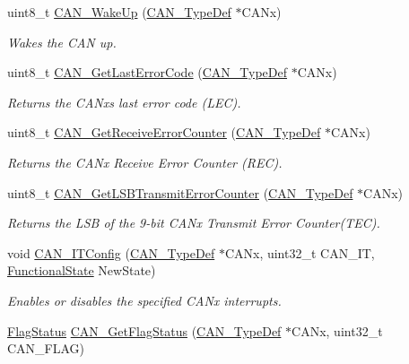 \begin{DoxyCompactItemize}
uint8\+\_\+t \hyperlink{group___c_a_n___exported___functions_ga78cdfbf1884b9e33c552bcbca15bed10}{C\+A\+N\+\_\+\+Wake\+Up} (\hyperlink{struct_c_a_n___type_def}{C\+A\+N\+\_\+\+Type\+Def} $\ast$C\+A\+Nx)
\begin{DoxyCompactList}\small\item\em Wakes the C\+AN up. \end{DoxyCompactList}\item 
uint8\+\_\+t \hyperlink{group___c_a_n___exported___functions_gaaee721a392b6b21bfd15dc160aeb6924}{C\+A\+N\+\_\+\+Get\+Last\+Error\+Code} (\hyperlink{struct_c_a_n___type_def}{C\+A\+N\+\_\+\+Type\+Def} $\ast$C\+A\+Nx)
\begin{DoxyCompactList}\small\item\em Returns the C\+A\+Nx\textquotesingle{}s last error code (L\+EC). \end{DoxyCompactList}\item 
uint8\+\_\+t \hyperlink{group___c_a_n___exported___functions_ga6903eecbec40eb1361d915ddde9a3274}{C\+A\+N\+\_\+\+Get\+Receive\+Error\+Counter} (\hyperlink{struct_c_a_n___type_def}{C\+A\+N\+\_\+\+Type\+Def} $\ast$C\+A\+Nx)
\begin{DoxyCompactList}\small\item\em Returns the C\+A\+Nx Receive Error Counter (R\+EC). \end{DoxyCompactList}\item 
uint8\+\_\+t \hyperlink{group___c_a_n___exported___functions_ga85ee0c35bf7ca15d4e4c862eef534843}{C\+A\+N\+\_\+\+Get\+L\+S\+B\+Transmit\+Error\+Counter} (\hyperlink{struct_c_a_n___type_def}{C\+A\+N\+\_\+\+Type\+Def} $\ast$C\+A\+Nx)
\begin{DoxyCompactList}\small\item\em Returns the L\+SB of the 9-\/bit C\+A\+Nx Transmit Error Counter(\+T\+E\+C). \end{DoxyCompactList}\item 
void \hyperlink{group___c_a_n___exported___functions_gad1a8b2499a780b5bfa4accb3597b02f4}{C\+A\+N\+\_\+\+I\+T\+Config} (\hyperlink{struct_c_a_n___type_def}{C\+A\+N\+\_\+\+Type\+Def} $\ast$C\+A\+Nx, uint32\+\_\+t C\+A\+N\+\_\+\+IT, \hyperlink{group___exported__types_gac9a7e9a35d2513ec15c3b537aaa4fba1}{Functional\+State} New\+State)
\begin{DoxyCompactList}\small\item\em Enables or disables the specified C\+A\+Nx interrupts. \end{DoxyCompactList}\item 
\hyperlink{group___exported__types_ga89136caac2e14c55151f527ac02daaff}{Flag\+Status} \hyperlink{group___c_a_n___exported___functions_ga2faad96caf823ef463cc5b5b25c480bb}{C\+A\+N\+\_\+\+Get\+Flag\+Status} (\hyperlink{struct_c_a_n___type_def}{C\+A\+N\+\_\+\+Type\+Def} $\ast$C\+A\+Nx, uint32\+\_\+t C\+A\+N\+\_\+\+F\+L\+AG)

\end{DoxyCompactItemize}
